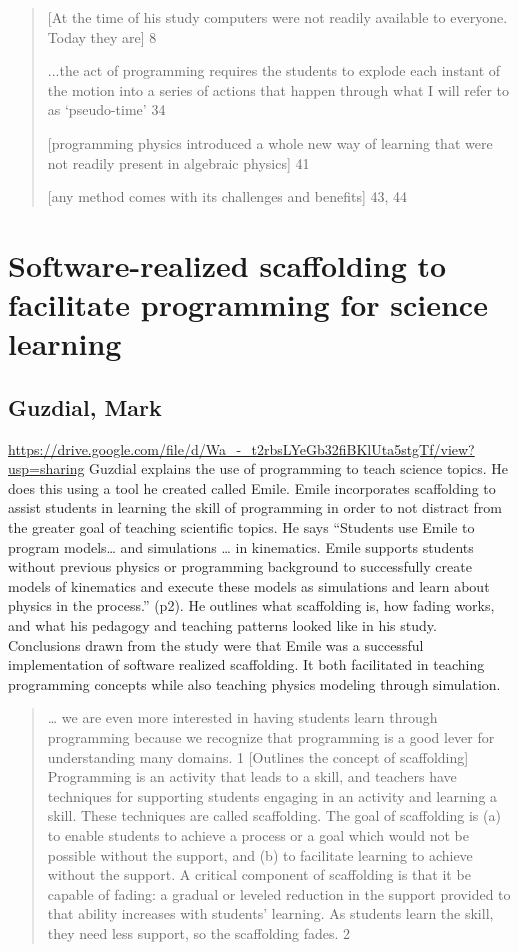 \documentclass[12pt]{extarticle}
\begin{document}
{\begin{quotation}
[At the time of his study computers were not readily available to everyone. Today they are] 	8

...the act of programming requires the students to explode each instant of the motion into a series of actions that happen through what I will refer to as ‘pseudo-time’	34

[programming physics introduced a whole new way of learning that were not readily present in algebraic physics] 	41

[any method comes with its challenges and benefits]	43, 44
\end{quotation}
	

\section*{Software-realized scaffolding to facilitate programming for science learning}
\subsection*{Guzdial, Mark}
\url{https://drive.google.com/file/d/Wa_-_t2rbsLYeGb32fiBKlUta5stgTf/view?usp=sharing}
Guzdial explains the use of programming to teach science topics. He does this using a tool he created called Emile. Emile incorporates scaffolding to assist students in learning the skill of programming in order to not distract from the greater goal of teaching scientific topics. He says “Students use Emile to program models… and simulations … in kinematics. Emile supports students without previous physics or programming background to successfully create models of kinematics and execute these models as simulations and learn about physics in the process.” (p2). He outlines what scaffolding is, how fading works, and what his pedagogy and teaching patterns looked like in his study. Conclusions drawn from the study were that Emile was a successful implementation of software realized scaffolding. It both facilitated in teaching programming concepts while also teaching physics modeling through simulation.
\begin{quote}
… we are even more interested in having students learn through programming because we recognize that programming is a good lever for understanding many domains. 	1
[Outlines the concept of scaffolding] Programming is an activity that leads to a skill, and teachers have techniques for supporting students engaging in an activity and learning a skill. These techniques are called scaffolding. The goal of scaffolding is (a) to enable students to achieve a process or a goal which would not be possible without the support, and (b) to facilitate learning to achieve without the support. A critical component of scaffolding is that it be capable of fading: a gradual or leveled reduction in the support provided to that ability increases with students’ learning. As students learn the skill, they need less support, so the scaffolding fades. 	2


\end{quote}}
\end{document}
